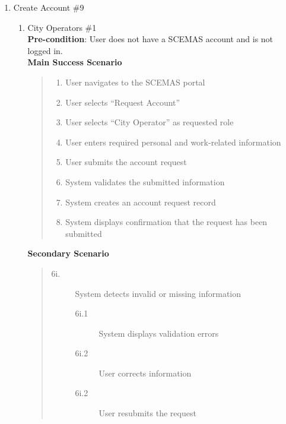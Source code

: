 \documentclass[]{article}
\begin{document}
\begin{enumerate}[{\bf BE9.}]
	\item Create Account \#9
		\begin{enumerate}[{\bf VP1.}]
			\item City Operators \#1\\
                \textbf{Pre-condition}: User does not have a SCEMAS account and is not logged in. \\
                \textbf{Main Success Scenario}
                \begin{quote}
                    \begin{enumerate}[1.]
                        \item User navigates to the SCEMAS portal
                        \item User selects ``Request Account''
                        \item User selects ``City Operator'' as requested role
                        \item User enters required personal and work-related information
                        \item User submits the account request
                        \item System validates the submitted information
                        \item System creates an account request record
                        \item System displays confirmation that the request has been submitted
                    \end{enumerate}
                \end{quote}
                \textbf{Secondary Scenario}
                \begin{quote}
                    \begin{description}
                        \item[\textmd{6i.}] System detects invalid or missing information
                        \begin{description}
                            \item[\textmd{6i.1}] System displays validation errors
                            \item[\textmd{6i.2}] User corrects information
                            \item[\textmd{6i.2}] User resubmits the request
                        \end{description}
                    \end{description}
                \end{quote}
                        

\end{enumerate}
\end{enumerate}
\end{document}
